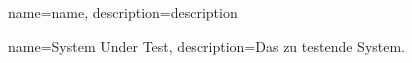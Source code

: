  {
	name={name},
	description={description}
}

 {
	name={System Under Test},
	description={Das zu testende System.}
}
